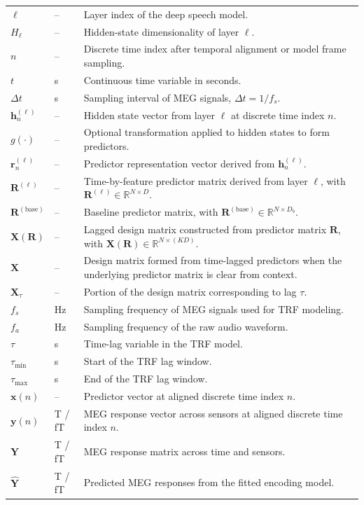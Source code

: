 \documentclass[12pt, titlepage]{article}
\begin{document}
\begin{longtable}{l l p{11.0cm}}
$\ell$ & -- & Layer index of the deep speech model.\\
$H_{\ell}$ & -- & Hidden-state dimensionality of layer $\ell$.\\
$n$ & -- & Discrete time index after temporal alignment or model frame sampling.\\
$t$ & \si{\second} & Continuous time variable in seconds.\\
$\Delta t$ & \si{\second} & Sampling interval of MEG signals, $\Delta t = 1/f_s$.\\

$\boldsymbol{h}^{(\ell)}_{n}$ & -- & Hidden state vector from layer $\ell$ at discrete time index $n$.\\
$g(\cdot)$ & -- & Optional transformation applied to hidden states to form predictors.\\
$\boldsymbol{r}^{(\ell)}_{n}$ & -- & Predictor representation vector derived from $\boldsymbol{h}^{(\ell)}_{n}$.\\
$\mathbf{R}^{(\ell)}$ & -- & Time-by-feature predictor matrix derived from layer $\ell$, with $\mathbf{R}^{(\ell)} \in \mathbb{R}^{N \times D}$.\\
$\mathbf{R}^{(\mathrm{base})}$ & -- & Baseline predictor matrix, with $\mathbf{R}^{(\mathrm{base})} \in \mathbb{R}^{N \times D_b}$.\\

$\mathbf{X}(\mathbf{R})$ & -- & Lagged design matrix constructed from predictor matrix $\mathbf{R}$, with $\mathbf{X}(\mathbf{R}) \in \mathbb{R}^{N \times (KD)}$.\\
$\mathbf{X}$ & -- & Design matrix formed from time-lagged predictors when the underlying predictor matrix is clear from context.\\
$\mathbf{X}_{\tau}$ & -- & Portion of the design matrix corresponding to lag $\tau$.\\

$f_s$ & \si{\hertz} & Sampling frequency of MEG signals used for TRF modeling.\\
$f_a$ & \si{\hertz} & Sampling frequency of the raw audio waveform.\\
$\tau$ & \si{\second} & Time-lag variable in the TRF model.\\
$\tau_{\min}$ & \si{\second} & Start of the TRF lag window.\\
$\tau_{\max}$ & \si{\second} & End of the TRF lag window.\\

$\boldsymbol{x}(n)$ & -- & Predictor vector at aligned discrete time index $n$.\\
$\boldsymbol{y}(n)$ & \si{\tesla} / \si{\femto\tesla} & MEG response vector across sensors at aligned discrete time index $n$.\\
$\mathbf{Y}$ & \si{\tesla} / \si{\femto\tesla} & MEG response matrix across time and sensors.\\
$\hat{\mathbf{Y}}$ & \si{\tesla} / \si{\femto\tesla} & Predicted MEG responses from the fitted encoding model.\\


\end{longtable}
\end{document}
